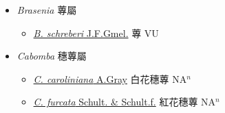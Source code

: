 
  \begin{itemize}
 \item[] \textit{Brasenia} 蓴屬
                    
  \begin{itemize}
        \item[] \href{http://www.theplantlist.org/tpl1.1/search?q=Brasenia+schreberi}{\textit{B. schreberi} J.F.Gmel.}   蓴 VU
  \end{itemize}
 \item[] \textit{Cabomba} 穗蓴屬
                    
  \begin{itemize}
        \item[] \href{http://www.theplantlist.org/tpl1.1/search?q=Cabomba+caroliniana}{\textit{C. caroliniana} A.Gray}   白花穗蓴 NA$^n$
        \item[] \href{http://www.theplantlist.org/tpl1.1/search?q=Cabomba+furcata}{\textit{C. furcata} Schult. \& Schult.f.}   紅花穗蓴 NA$^n$
  \end{itemize}
  \end{itemize}
